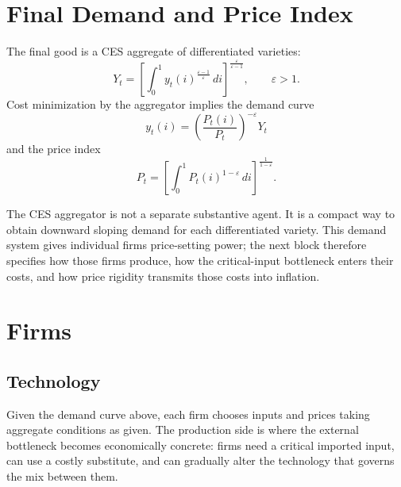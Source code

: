 ﻿\documentclass[12pt]{article}
\theoremstyle{remark}
\newcommand{\dd}{\,d}
\begin{document}
\section{Final Demand and Price Index}

The final good is a CES aggregate of differentiated varieties:
\begin{equation}
    Y_t=
    \left[
        \int_0^1 y_t(i)^{\frac{\varepsilon-1}{\varepsilon}}\dd i
    \right]^{\frac{\varepsilon}{\varepsilon-1}},
    \qquad
    \varepsilon>1.
    \label{eq:final_aggregator}
\end{equation}
Cost minimization by the aggregator implies the demand curve
\begin{equation}
    y_t(i)
    =
    \left(\frac{P_t(i)}{P_t}\right)^{-\varepsilon}Y_t
    \label{eq:variety_demand}
\end{equation}
and the price index
\begin{equation}
    P_t=
    \left[
        \int_0^1 P_t(i)^{1-\varepsilon}\dd i
    \right]^{\frac{1}{1-\varepsilon}}.
    \label{eq:price_index}
\end{equation}

The CES aggregator is not a separate substantive agent. It is a compact way to obtain downward
sloping demand for each differentiated variety. This demand system gives individual firms
price-setting power; the next block therefore specifies how those firms produce, how the
critical-input bottleneck enters their costs, and how price rigidity transmits those costs into
inflation.

\section{Firms}

\subsection{Technology}

Given the demand curve above, each firm chooses inputs and prices taking aggregate conditions as
given. The production side is where the external bottleneck becomes economically concrete: firms
need a critical imported input, can use a costly substitute, and can gradually alter the technology
that governs the mix between them.
\end{document}
